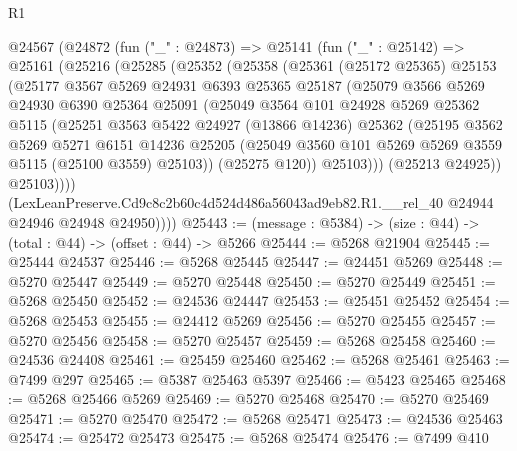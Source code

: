 \begin{lexlean}{R1}
\begin{coremodule}
  @24567
    (@24872
      (fun ("_" : @24873) =>
      @25141
        (fun ("_" : @25142) =>
        @25161
          (@25216
            (@25285
              (@25352
                (@25358
                  (@25361
                    (@25172 @25365)
                    @25153
                    (@25177
                      @3567
                      @5269
                      @24931
                      @6393
                      @25365
                      @25187
                      (@25079
                        @3566
                        @5269
                        @24930
                        @6390
                        @25364
                        @25091
                        (@25049
                          @3564
                          @101
                          @24928
                          @5269
                          @25362
                          @5115
                          (@25251
                            @3563
                            @5422
                            @24927
                            (@13866 @14236)
                            @25362
                            (@25195
                              @3562
                              @5269
                              @5271
                              @6151
                              @14236
                              @25205
                              (@25049 @3560 @101 @5269 @5269 @3559 @5115 (@25100 @3559) @25103))
                            (@25275 @120))
                          @25103)))
                    (@25213 @24925))
                  @25103))))
          (LexLeanPreserve.Cd9c8c2b60c4d524d486a56043ad9eb82.R1.__rel_40
            @24944
            @24946
            @24948
            @24950))))
@25443 := (message : @5384) -> (size : @44) -> (total : @44) -> (offset : @44) -> @5266
@25444 := @5268 @21904
@25445 := @25444 @24537
@25446 := @5268 @25445
@25447 := @24451 @5269
@25448 := @5270 @25447
@25449 := @5270 @25448
@25450 := @5270 @25449
@25451 := @5268 @25450
@25452 := @24536 @24447
@25453 := @25451 @25452
@25454 := @5268 @25453
@25455 := @24412 @5269
@25456 := @5270 @25455
@25457 := @5270 @25456
@25458 := @5270 @25457
@25459 := @5268 @25458
@25460 := @24536 @24408
@25461 := @25459 @25460
@25462 := @5268 @25461
@25463 := @7499 @297
@25465 := @5387 @25463 @5397
@25466 := @5423 @25465
@25468 := @5268 @25466 @5269
@25469 := @5270 @25468
@25470 := @5270 @25469
@25471 := @5270 @25470
@25472 := @5268 @25471
@25473 := @24536 @25463
@25474 := @25472 @25473
@25475 := @5268 @25474
@25476 := @7499 @410

\end{coremodule}
\end{lexlean}
